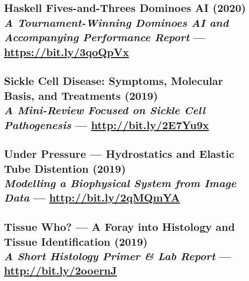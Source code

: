 \documentclass[twocolumn, a4paper, fontsize=9pt, headsepline, footsepline]{scrartcl}
\begin{document}
\subsection*{Haskell Fives-and-Threes Dominoes AI (2020)\\\hspace{14.22636pt}\textmd{\emph{A
    Tournament-Winning Dominoes AI and Accompanying Performance Report} —
    \url{https://bit.ly/3qoQpVx}}}

\subsection*{Sickle Cell Disease: Symptoms, Molecular Basis, and Treatments
(2019)\\\hspace{14.22636pt}\textmd{\emph{A Mini-Review Focused on Sickle Cell
    Pathogenesis} — \url{http://bit.ly/2E7Yu9x}}}


\subsection*{Under Pressure — Hydrostatics and Elastic Tube Distention
  (2019)\\\hspace{14.22636pt}\textmd{\emph{Modelling a Biophysical System from
    Image Data} — \url{http://bit.ly/2qMQmYA}}}


\subsection*{Tissue Who? — A Foray into Histology and Tissue Identification
  (2019)\\\hspace{14.22636pt}\textmd{\emph{A Short Histology Primer \& Lab
    Report} — \url{http://bit.ly/2ooernJ}}}
\end{document}
